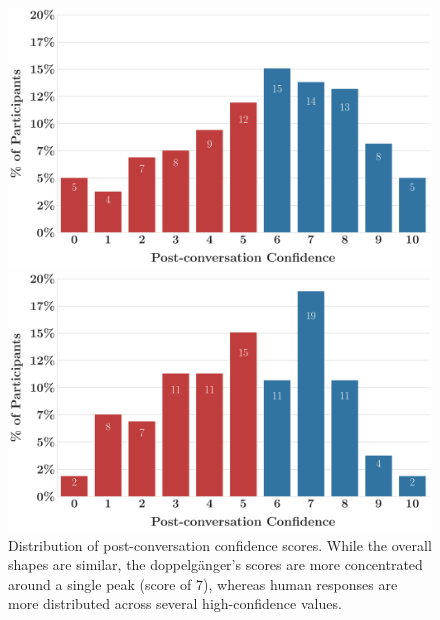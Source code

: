 \begin{figure}[ht!]
    \centering
    \begin{minipage}{0.48\textwidth}
        \centering
        \includegraphics[width=\linewidth]{fig/post-conf-human.pdf}
    \end{minipage}\hfill
    \begin{minipage}{0.49\textwidth}
        \centering
        \includegraphics[width=\linewidth]{fig/post-conf-gpt4-o.pdf}
    \end{minipage}
    \caption{Distribution of post-conversation confidence scores. While the overall shapes are similar, the doppelgänger's scores are more concentrated around a single peak (score of 7), whereas human responses are more distributed across several high-confidence values.}
    \label{fig:post_conf_distributions}
\end{figure}



